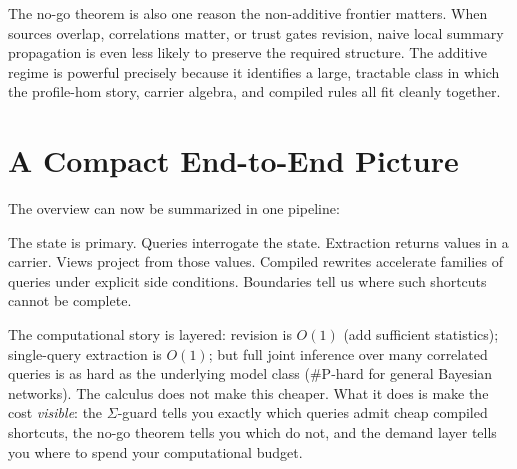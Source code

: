 \documentclass[11pt,openany]{report}
\begin{document}
The no-go theorem is also one reason the non-additive frontier matters.  When
sources overlap, correlations matter, or trust gates revision, naive local
summary propagation is even less likely to preserve the required structure.
The additive regime is powerful precisely because it identifies a large,
tractable class in which the profile-hom story, carrier algebra, and compiled
rules all fit cleanly together.

\section{A Compact End-to-End Picture}
\label{sec:overview-end-to-end}

The overview can now be summarized in one pipeline:

\medskip
\noindent
{}
\medskip

The state is primary.  Queries interrogate the state.  Extraction returns values
in a carrier.  Views project from those values.  Compiled rewrites accelerate
families of queries under explicit side conditions.  Boundaries tell us where
such shortcuts cannot be complete.

The computational story is layered: revision is $O(1)$ (add
sufficient statistics); single-query extraction is $O(1)$; but
full joint inference over many correlated queries is as hard as
the underlying model class (\#P-hard for general Bayesian
networks).  The calculus does not make this cheaper.  What it does
is make the cost \emph{visible}: the $\Sigma$-guard tells you
exactly which queries admit cheap compiled shortcuts, the no-go
theorem tells you which do not, and the demand layer tells you
where to spend your computational budget.
\end{document}
